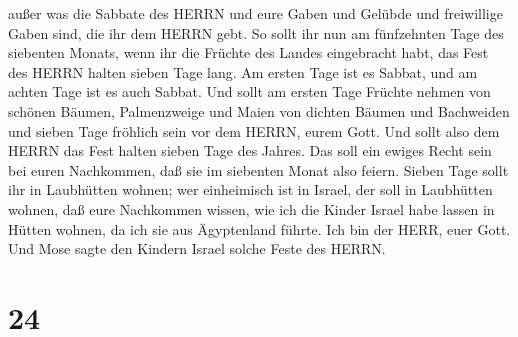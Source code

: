  außer was die Sabbate des HERRN und eure Gaben und Gelübde
und freiwillige Gaben sind, die ihr dem HERRN gebt.  So
sollt ihr nun am fünfzehnten Tage des siebenten Monats, wenn ihr die
Früchte des Landes eingebracht habt, das Fest des HERRN halten sieben
Tage lang. Am ersten Tage ist es Sabbat, und am achten Tage ist es auch
Sabbat.  Und sollt am ersten Tage Früchte nehmen von
schönen Bäumen, Palmenzweige und Maien von dichten Bäumen und Bachweiden
und sieben Tage fröhlich sein vor dem HERRN, eurem Gott. 
Und sollt also dem HERRN das Fest halten sieben Tage des Jahres. Das
soll ein ewiges Recht sein bei euren Nachkommen, daß sie im siebenten
Monat also feiern.  Sieben Tage sollt ihr in Laubhütten
wohnen; wer einheimisch ist in Israel, der soll in Laubhütten wohnen,
 daß eure Nachkommen wissen, wie ich die Kinder Israel habe
lassen in Hütten wohnen, da ich sie aus Ägyptenland führte. Ich bin der
HERR, euer Gott.  Und Mose sagte den Kindern Israel solche
Feste des HERRN.

\hypertarget{section-23}{%
\section{24}\label{section-23}}

